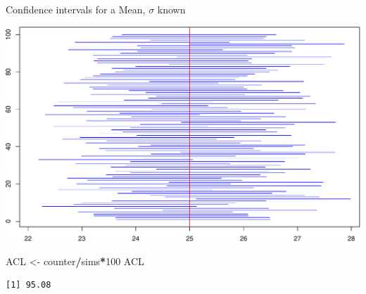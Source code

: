 \documentclass[
  ignorenonframetext,
]{beamer}
\newenvironment{Shaded}{\begin{snugshade}}{\end{snugshade}}
\newcommand{\DecValTok}[1]{\textcolor[rgb]{0.00,0.00,0.81}{#1}}
\newcommand{\NormalTok}[1]{#1}
\newcommand{\OtherTok}[1]{\textcolor[rgb]{0.56,0.35,0.01}{#1}}
\newcommand{\SpecialCharTok}[1]{\textcolor[rgb]{0.81,0.36,0.00}{\textbf{#1}}}
\begin{document}
\begin{frame}[fragile]{Confidence intervals for a Mean, \(\sigma\)
known}
\protect\hypertarget{confidence-intervals-for-a-mean-sigma-known-6}{}
\begin{center}\includegraphics[width=0.6\linewidth,height=0.7\textheight]{Week10_Lect_files/figure-beamer/unnamed-chunk-49-1} \end{center}
\normalsize

\tiny

\begin{Shaded}
\begin{Highlighting}[]
\NormalTok{ACL }\OtherTok{\textless{}{-}}\NormalTok{ counter}\SpecialCharTok{/}\NormalTok{sims}\SpecialCharTok{*}\DecValTok{100}
\NormalTok{ACL}
\end{Highlighting}
\end{Shaded}

\begin{verbatim}
[1] 95.08
\end{verbatim}

\normalsize
\end{frame}
\end{document}

